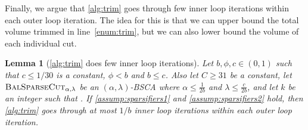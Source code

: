 \documentclass[epsfig,letter,11pt]{article}
\numberwithin{equation}{section}
\newcommand{\bsc}{\textsc{BalSparseCut}_{\alpha,\lambda}}
\newtheorem{lemma}[theorem]{Lemma}
\begin{document}
\noindent
Finally, we argue that \cref{alg:trim} goes through few inner loop iterations within each outer loop iteration. The idea for this is that we can upper bound the total volume trimmed in line~\eqref{enum:trim}, but we can also lower bound the volume of each individual cut.

\begin{lemma}[\cref{alg:trim} does few inner loop iterations]
	\label{lem:boundinnerloop}
	Let $b, \phi,c \in (0,1)$ such that $c \leq 1/30$ is a constant, $\phi < b$ and $b \le c$. Also let $C \ge 31$ be a constant, let $\bsc$ be an $(\alpha,\lambda)$-BSCA where $\alpha \le \frac{1}{2b}$ and $\lambda \le \frac{c}{2b}$, and let $k$ be an integer such that . If \cref{assump:sparsifiers1} and \cref{assump:sparsifiers2} hold, then \cref{alg:trim} goes through at most $1/{b}$ inner loop iterations within each outer loop iteration.
\end{lemma}
\end{document}
